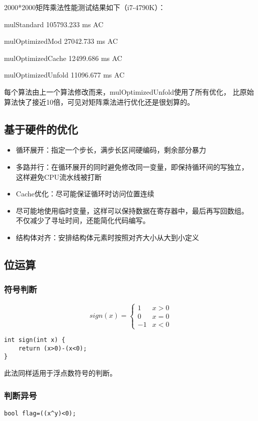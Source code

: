 2000*2000矩阵乘法性能测试结果如下（i7-4790K）：

mulStandard 105793.233 ms AC

mulOptimizedMod 27042.733 ms AC

mulOptimizedCache 12499.686 ms AC

mulOptimizedUnfold 11096.677 ms AC

每个算法由上一个算法修改而来，mulOptimizedUnfold使用了所有优化，
比原始算法快了接近10倍，可见对矩阵乘法进行优化还是很划算的。
\subsection{基于硬件的优化}
\begin{itemize}
    \item 循环展开：指定一个步长，满步长区间硬编码，剩余部分暴力
    \item 多路并行：在循环展开的同时避免修改同一变量，即保持循环间的写独立，
    这样避免CPU流水线被打断
    \item Cache优化：尽可能保证循环时访问位置连续
    \item 尽可能地使用临时变量，这样可以保持数据在寄存器中，最后再写回数组。
    不仅减少了寻址时间，还能简化代码编写。
    \item 结构体对齐：安排结构体元素时按照对齐大小从大到小定义
\end{itemize}
\subsection{位运算}\label{Bitwise}
\subsubsection{符号判断}
\begin{displaymath}
    sign(x)=\left\{\begin{array}{cc}
        1&x>0\\
        0&x=0\\
        -1&x<0
    \end{array}\right.
\end{displaymath}
\begin{lstlisting}
int sign(int x) {
    return (x>0)-(x<0);
}
\end{lstlisting}

此法同样适用于浮点数符号的判断。
\subsubsection{判断异号}
\begin{lstlisting}
bool flag=((x^y)<0);
\end{lstlisting}
